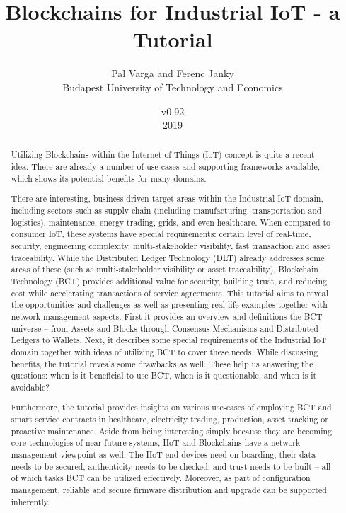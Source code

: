 \documentclass[a4paper]{article}
\title{Blockchains for Industrial IoT - a Tutorial}
\author{Pal Varga and Ferenc Janky \\ Budapest University of Technology and Economics}
\date{v0.92 \\ 2019}
\begin{document}
\maketitle

\begin{abstract}
Utilizing Blockchains within the Internet of Things (IoT) concept is quite a recent idea. There are already a number of use cases and supporting frameworks available, which shows its potential benefits for many domains.

There are interesting, business-driven target areas within the Industrial IoT domain, including sectors such as supply chain (including manufacturing, transportation and logistics), maintenance, energy trading, grids, and even healthcare. When compared to consumer IoT, these systems have special requirements: certain level of real-time, security, engineering complexity, multi-stakeholder visibility, fast transaction and asset traceability. While the Distributed Ledger Technology (DLT) already addresses some areas of these (such as multi-stakeholder visibility or asset traceability), Blockchain Technology (BCT) provides additional value for security, building trust, and reducing cost while accelerating transactions of service agreements.
This tutorial aims to reveal the opportunities and challenges as well as presenting real-life examples together with network management aspects. First it provides an overview and definitions the BCT universe – from Assets and Blocks through Consensus Mechanisms and Distributed Ledgers to Wallets. Next, it describes some special requirements of the Industrial IoT domain together with ideas of utilizing BCT to cover these needs. While discussing benefits, the tutorial reveals some drawbacks as well. These help us answering the questions: when is it beneficial to use BCT, when is it questionable, and when is it avoidable?

Furthermore, the tutorial provides insights on various use-cases of employing BCT and smart service contracts in healthcare, electricity trading, production, asset tracking or proactive maintenance. Aside from being interesting simply because they are becoming core technologies of near-future systems, IIoT and Blockchains have a network management viewpoint as well. The IIoT end-devices need on-boarding, their data needs to be secured, authenticity needs to be checked, and trust needs to be built – all of which tasks BCT can be utilized effectively. Moreover, as part of configuration management, reliable and secure firmware distribution and upgrade can be supported inherently.


\end{abstract}
\end{document}
